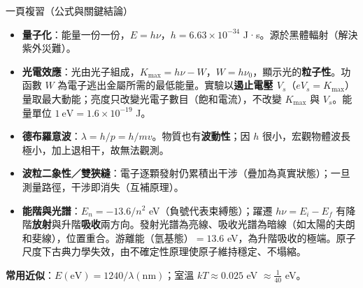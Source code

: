 \documentclass[11pt]{article}
\begin{document}
\begin{補充框}{一頁複習（公式與關鍵結論）}
\begin{itemize}\setlength{\itemsep}{2pt}
\item \textbf{量子化}：能量一份一份，$E=h\nu$，$h=6.63\times10^{-34}$ J·s。源於黑體輻射（解決紫外災難）。
\item \textbf{光電效應}：光由光子組成，$K_{\max}=h\nu-W$，$W=h\nu_0$，顯示光的\textbf{粒子性}。功函數 $W$ 為電子逃出金屬所需的最低能量。實驗以\textbf{遏止電壓 $V_s$}（$eV_s=K_{\max}$）量取最大動能；亮度只改變光電子數目（飽和電流），不改變 $K_{\max}$ 與 $V_s$。能量單位 $1\ \text{eV}=1.6\times10^{-19}$ J。
\item \textbf{德布羅意波}：$\lambda=h/p=h/mv$。物質也有\textbf{波動性}；因 $h$ 很小，宏觀物體波長極小，加上退相干，故無法觀測。
\item \textbf{波粒二象性／雙狹縫}：電子逐顆發射仍累積出干涉（疊加為真實狀態）；一旦測量路徑，干涉即消失（互補原理）。
\item \textbf{能階與光譜}：$E_n=-13.6/n^2$ eV（負號代表束縛態）；躍遷 $h\nu=E_i-E_f$ 有降階\textbf{放射}與升階\textbf{吸收}兩方向。發射光譜為亮線、吸收光譜為暗線（如太陽的夫朗和斐線），位置重合。游離能（氫基態）$=13.6$ eV，為升階吸收的極端。原子尺度下古典力學失效，由不確定性原理使原子維持穩定、不塌縮。
\end{itemize}
\textbf{常用近似}：$E(\text{eV})=1240/\lambda(\text{nm})$；室溫 $kT\approx0.025$ eV $\approx\tfrac{1}{40}$ eV。
\end{補充框}
\end{document}
